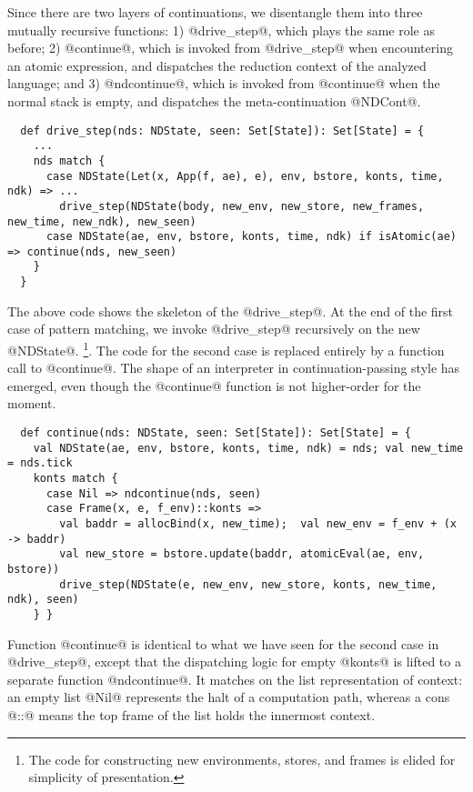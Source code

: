 \documentclass[acmsmall, screen]{acmart}\settopmatter{}
\begin{document}
Since there are two layers of continuations, we disentangle them into three mutually recursive
functions:
1) @drive_step@, which plays the same role as before;
2) @continue@, which is invoked from @drive_step@ when encountering an atomic expression,
  and dispatches the reduction context of the analyzed language; and
3) @ndcontinue@, which is invoked from @continue@ when the normal stack is empty,
  and dispatches the meta-continuation @NDCont@.

\begin{lstlisting}
  def drive_step(nds: NDState, seen: Set[State]): Set[State] = {
    ...
    nds match {
      case NDState(Let(x, App(f, ae), e), env, bstore, konts, time, ndk) => ...
        drive_step(NDState(body, new_env, new_store, new_frames, new_time, new_ndk), new_seen)
      case NDState(ae, env, bstore, konts, time, ndk) if isAtomic(ae) => continue(nds, new_seen)
    }
  }
\end{lstlisting}

The above code shows the skeleton of the @drive_step@.
At the end of the first case of pattern matching, we invoke @drive_step@ recursively
on the new @NDState@.
\footnote{The code for constructing new environments, stores, and frames is elided for
simplicity of presentation.}.
The code for the second case is replaced entirely by a function call to @continue@.
The shape of an interpreter in continuation-passing style has emerged, even though
the @continue@ function is not higher-order for the moment.

\begin{lstlisting}
  def continue(nds: NDState, seen: Set[State]): Set[State] = {
    val NDState(ae, env, bstore, konts, time, ndk) = nds; val new_time = nds.tick
    konts match {
      case Nil => ndcontinue(nds, seen)
      case Frame(x, e, f_env)::konts =>
        val baddr = allocBind(x, new_time);  val new_env = f_env + (x -> baddr)
        val new_store = bstore.update(baddr, atomicEval(ae, env, bstore))
        drive_step(NDState(e, new_env, new_store, konts, new_time, ndk), seen)
    } }
\end{lstlisting}

Function @continue@ is identical to what we have seen for the second case in @drive_step@,
except that the dispatching logic for empty @konts@ is lifted to a separate function
@ndcontinue@.
It matches on the list representation of context: an empty list @Nil@ represents the
halt of a computation path, whereas a cons @::@ means the top frame of the list
holds the innermost context.
\end{document}
